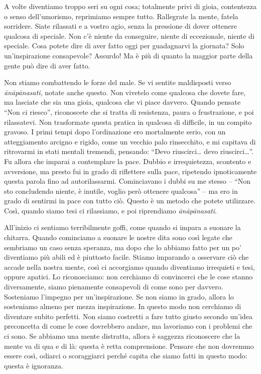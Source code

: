 A volte diventiamo troppo seri su ogni cosa; totalmente privi di gioia,
contentezza o senso dell'umorismo, reprimiamo sempre tutto. Rallegrate
la mente, fatela sorridere. Siate rilassati e a vostro agio, senza la
pressione di dover ottenere qualcosa di speciale. Non c'è niente da
conseguire, niente di eccezionale, niente di speciale. Cosa potete dire
di aver fatto oggi per guadagnarvi la giornata? Solo un'inspirazione
consapevole? Assurdo! Ma è più di quanto la maggior parte della gente
può dire di aver fatto.

Non stiamo combattendo le forze del male. Se vi sentite maldisposti
verso \emph{ānāpānasati}, notate anche questo. Non vivetelo come
qualcosa che dovete fare, ma lasciate che sia una gioia, qualcosa che vi
piace davvero. Quando pensate ``Non ci riesco'', riconoscete che si
tratta di resistenza, paura o frustrazione, e poi rilassatevi. Non
trasformate questa pratica in qualcosa di difficile, in un compito
gravoso. I primi tempi dopo l'ordinazione ero mortalmente serio, con un
atteggiamento arcigno e rigido, come un vecchio palo rinsecchito, e mi
capitava di ritrovarmi in stati mentali tremendi, pensando: ``Devo
riuscirci\ldots{} devo riuscirci\ldots{}''. Fu allora che imparai a
contemplare la pace. Dubbio e irrequietezza, scontento e avversione, ma
presto fui in grado di riflettere sulla pace, ripetendo ipnoticamente
questa parola fino ad autorilassarmi. Cominciavano i dubbi su me stesso
-- ``Non sto concludendo niente, è inutile, voglio però ottenere
qualcosa'' -- ma ero in grado di sentirmi in pace con tutto ciò. Questo
è un metodo che potete utilizzare. Così, quando siamo tesi ci
rilassiamo, e poi riprendiamo \emph{ānāpānasati}.

All'inizio ci sentiamo terribilmente goffi, come quando si impara a
suonare la chitarra. Quando cominciamo a suonare le nostre dita sono
così legate che sembriamo un caso senza speranza, ma dopo che lo abbiamo
fatto per un po' diventiamo più abili ed è piuttosto facile. Stiamo
imparando a osservare ciò che accade nella nostra mente, così ci
accorgiamo quando diventiamo irrequieti e tesi, oppure apatici. Lo
riconosciamo: non cerchiamo di convincerci che le cose stanno
diversamente, siamo pienamente consapevoli di come sono per davvero.
Sosteniamo l'impegno per un'inspirazione. Se non siamo in grado, allora
lo sosteniamo almeno per mezza inspirazione. In questo modo non
cerchiamo di diventare subito perfetti. Non siamo costretti a fare tutto
giusto secondo un'idea preconcetta di come le cose dovrebbero andare, ma
lavoriamo con i problemi che ci sono. Se abbiamo una mente distratta,
allora è saggezza riconoscere che la mente va di qua e di là: questa è
retta comprensione. Pensare che non dovremmo essere così, odiarci o
scoraggiarci perché capita che siamo fatti in questo modo: questa è
ignoranza.

